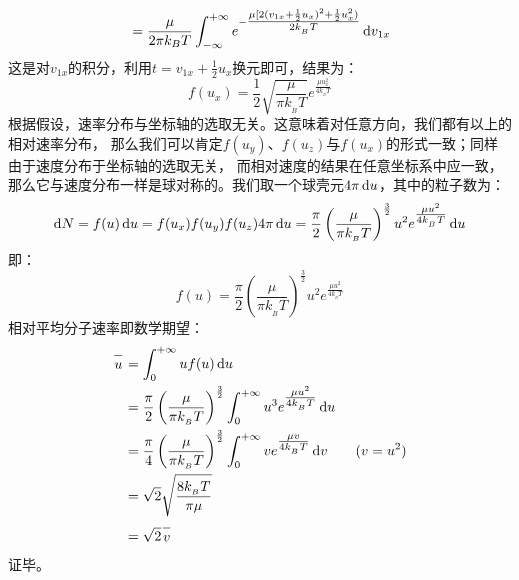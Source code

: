 \begin{prove}
\begin{equation*}
\begin{aligned}
                   & =\frac{\mu}{2\pi k_{B}T} \int_{-\infty}^{+\infty} e^{-\tfrac{\mu [2(v_{1x} + \frac{1}{2}u_{x})^{2}+ \frac{1}{2} u_{x}^{2})}{2k_{_B}T}} \dif v_{1x} \\
        \end{aligned}
    \end{equation*}
    这是对$v_{1x}$的积分，利用$t = v_{1x} + \frac{1}{2}u_{x}$换元即可，结果为：
    \begin{equation*}
        f(u_x) = \frac{1}{2}\sqrt{\frac{\mu}{\pi k_{_B}T}}e^{\tfrac{\mu u_{x}^{2}}{4k_{_B}T}}
    \end{equation*}
    根据假设，速率分布与坐标轴的选取无关。这意味着对任意方向，我们都有以上的相对速率分布，
    那么我们可以肯定$f(u_y)$、$f(u_z)$与$f(u_x)$的形式一致；同样由于速度分布于坐标轴的选取无关，
    而相对速度的结果在任意坐标系中应一致，那么它与速度分布一样是球对称的。我们取一个球壳元$4\pi \dif u$，其中的粒子数为：
    \begin{equation*}
        \dif N = f(u)\dif u = f(u_x)f(u_y)f(u_z) 4\pi \dif u =  \frac{\pi}{2}\left(\frac{\mu}{\pi k_{_B}T}\right)^{\frac{3}{2}} u^{2} e^{\tfrac{\mu u^{2}}{4k_{_B}T}}\dif u
    \end{equation*}
    即：
    \begin{equation*}
        f(u)= \frac{\pi}{2}\left(\frac{\mu}{\pi k_{_B}T}\right)^{\frac{3}{2}} u^{2} e^{\tfrac{\mu u^{2}}{4k_{_B}T}}
    \end{equation*}
    相对平均分子速率即数学期望：
    \begin{equation*}
        \begin{aligned}
            \upperline{u} & = \int_{0}^{+\infty}uf(u)\dif u                                                                                                       \\
                          & =\frac{\pi}{2}\left(\frac{\mu}{\pi k_{_B}T}\right)^{\frac{3}{2}}\int_{0}^{+\infty} u^{3} e^{\tfrac{\mu u^{2}}{4k_{_B}T}}\dif u        \\
                          & =\frac{\pi}{4}\left(\frac{\mu}{\pi k_{_B}T}\right)^{\frac{3}{2}}\int_{0}^{+\infty} v e^{\tfrac{\mu v}{4k_{_B}T}}\dif v\qquad(v = u^2) \\
                          & =\sqrt{2}\sqrt{\frac{8k_{_B}T}{\pi \mu}}                                                                                              \\
                          & =\sqrt{2}\upperline{v}
        \end{aligned}
    \end{equation*}
    证毕。
\end{prove}
